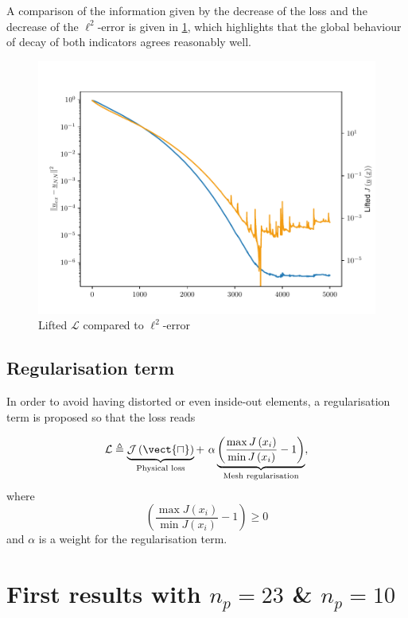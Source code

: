 A comparison of the information given by the decrease of the loss and the decrease of the $\ell^2$-error is given in \cref{fig:L2_vs_PE}, which highlights that the global behaviour of decay of both indicators agrees reasonably well.

\begin{figure}
    \centering
    \includegraphics[width=0.7\linewidth]{Figures/Loss_Comaprison.pdf}
    \caption{Lifted $\mathcal{L}$ compared to  $\ell^2$-error}
    \label{fig:L2_vs_PE}
\end{figure}

\subsection{Regularisation term}

In order to avoid having distorted or even inside-out elements, a regularisation term is proposed so that the loss reads

\begin{equation}
    \mathcal{L} \triangleq\underbrace{ \mathcal{J\left(\vect{u}\right)} }_{\text{Physical loss}} + ~\alpha \underbrace{\left(\frac{\max J\left(x_i\right)}{\min J\left(x_i\right)} - 1\right)}_{\text{Mesh regularisation}},
\end{equation}
where 
\begin{equation}
    \left(\frac{\max J\left(x_i\right)}{\min J\left(x_i\right)} - 1\right) \ge 0
\end{equation}
and $\alpha$ is a weight for the regularisation term.

\section{First results with $n_p=23$ \& $n_p=10$}
